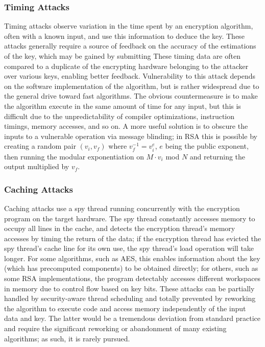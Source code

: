 \documentclass[times, 10pt,twocolumn]{article}
\begin{document}
\subsubsection{Timing Attacks}
Timing attacks observe variation in the time spent by an encryption algorithm, often with a known input, and use this information to deduce the key.  These attacks generally require a source of feedback on the accuracy of the estimations of the key, which may be gained by submitting  These timing data are often compared to a duplicate of the encrypting hardware belonging to the attacker over various keys, enabling better feedback.  Vulnerability to this attack depends on the software implementation of the algorithm, but is rather widespread due to the general drive toward fast algorithms.  The obvious countermeasure is to make the algorithm execute in the same amount of time for any input, but this is difficult due to the unpredictability of compiler optimizations, instruction timings, memory accesses, and so on.  A more useful solution is to obscure the inputs to a vulnerable operation via message blinding\cite{mmthesis}; in RSA this is possible by creating a random pair $(v_{i},v_{f})$ where $v_{f}^{-1}=v_{i}^e$, $e$ being the public exponent, then running the modular exponentiation on $M\cdot v_{i}$ mod $N$ and returning the output multiplied by $v_{f}$\cite{Kocher96timingattacks}.

\subsubsection{Caching Attacks}
Caching attacks use a spy thread running concurrently with the encryption program on the target hardware.  The spy thread constantly accesses memory to occupy all lines in the cache, and detects the encryption thread's memory accesses by timing the return of the data; if the encryption thread has evicted the spy thread's cache line for its own use, the spy thread's load operation will take longer.  For some algorithms, such as AES\cite{2004-bernstein-cachetiming}, this enables information about the key (which has precomputed components) to be obtained directly; for others, such as some RSA implementations\cite{Percival05cachemissing}, the program detectably accesses different workspaces in memory due to control flow based on key bits.  These attacks can be partially handled by security-aware thread scheduling and totally prevented by reworking the algorithm to execute code and access memory independently of the input data and key.  The latter would be a tremendous deviation from standard practice and require the significant reworking or abandonment of many existing algorithms\cite{Percival05cachemissing}; as such, it is rarely pursued.
\end{document}
